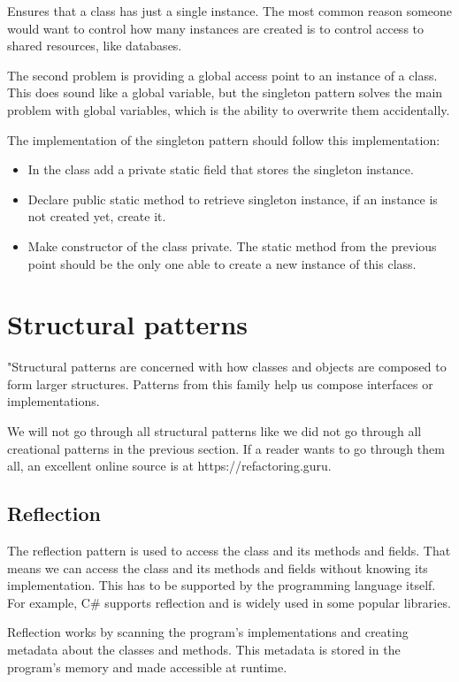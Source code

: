Ensures that a class has just a single instance. The most common reason someone would want to control how many instances are created is to control access to shared resources, like databases.

The second problem is providing a global access point to an instance of a class. This does sound like a global variable, but the singleton pattern solves the main problem with global variables, which is the ability to overwrite them accidentally.

The implementation of the singleton pattern should follow this implementation:
\begin{itemize}
    \item {In the class add a private static field that stores the singleton instance.}
    \item {Declare public static method to retrieve singleton instance, if an instance is not created yet, create it.}
    \item {Make constructor of the class private. The static method from the previous point should be the only one able to create a new instance of this class.}
\end{itemize}

\section{Structural patterns}

"Structural patterns are concerned with how classes and objects are composed to form larger structures. Patterns from this family help us compose interfaces or implementations. \cite{gamma_design_1995}

We will not go through all structural patterns like we did not go through all creational patterns in the previous section. If a reader wants to go through them all, an excellent online source is at https://refactoring.guru.

\subsection {Reflection}

The reflection pattern is used to access the class and its methods and fields. That means we can access the class and its methods and fields without knowing its implementation.
This has to be supported by the programming language itself. For example, C\# supports reflection and is widely used in some popular libraries.

Reflection works by scanning the program's implementations and creating metadata about the classes and methods. This metadata is stored in the program's memory and made accessible at
runtime.

